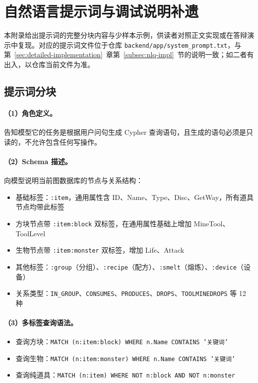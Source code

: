 \section{自然语言提示词与调试说明补遗}
\label{app:prompt-supplement}

本附录给出提示词的完整分块内容与少样本示例，供读者对照正文实现或在答辩演示中复现。对应的提示词文件位于仓库 \texttt{backend/app/system\_prompt.txt}，与第~\ref{sec:detailed-implementation}~章第~\ref{subsec:nlq-impl}~节的说明一致；如二者有出入，以仓库当前文件为准。

\subsection{提示词分块}

\paragraph{（1）角色定义。}
告知模型它的任务是根据用户问句生成 Cypher 查询语句，且生成的语句必须是只读的，不允许包含任何写操作。

\paragraph{（2）Schema 描述。}
向模型说明当前图数据库的节点与关系结构：
\begin{itemize}
    \item 基础标签：\texttt{:item}，通用属性含 ID、Name、Type、Disc、GetWay，所有道具节点均带此标签
    \item 方块节点带 \texttt{:item:block} 双标签，在通用属性基础上增加 MineTool、ToolLevel
    \item 生物节点带 \texttt{:item:monster} 双标签，增加 Life、Attack
    \item 其他标签：\texttt{:group}（分组）、\texttt{:recipe}（配方）、\texttt{:smelt}（熔炼）、\texttt{:device}（设备）
    \item 关系类型：\texttt{IN\_GROUP}、\texttt{CONSUMES}、\texttt{PRODUCES}、\texttt{DROPS}、\texttt{TOOLMINEDROPS} 等 12 种
\end{itemize}

\paragraph{（3）多标签查询语法。}
\begin{itemize}
    \item 查询方块：\texttt{MATCH (n:item:block) WHERE n.Name CONTAINS '关键词'}
    \item 查询生物：\texttt{MATCH (n:item:monster) WHERE n.Name CONTAINS '关键词'}
    \item 查询纯道具：\texttt{MATCH (n:item) WHERE NOT n:block AND NOT n:monster}
\end{itemize}

